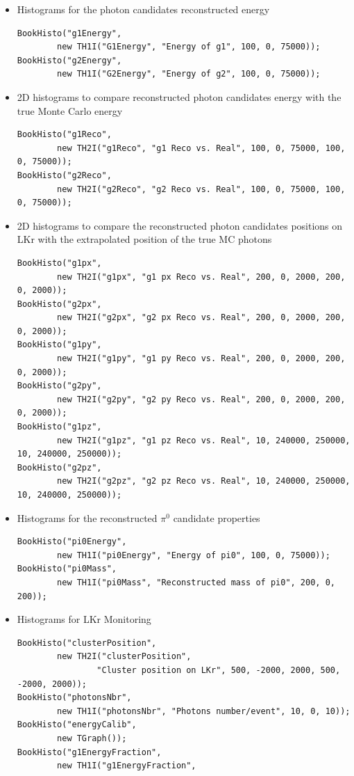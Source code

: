 \begin{itemize}
  \item Histograms for the photon candidates reconstructed energy 
\begin{lstlisting}
BookHisto("g1Energy", 
		new TH1I("G1Energy", "Energy of g1", 100, 0, 75000));
BookHisto("g2Energy", 
		new TH1I("G2Energy", "Energy of g2", 100, 0, 75000));
\end{lstlisting}
	\item 2D histograms to compare reconstructed photon candidates energy with the true Monte Carlo
	energy
\begin{lstlisting}
BookHisto("g1Reco", 
		new TH2I("g1Reco", "g1 Reco vs. Real", 100, 0, 75000, 100, 0, 75000));
BookHisto("g2Reco", 
		new TH2I("g2Reco", "g2 Reco vs. Real", 100, 0, 75000, 100, 0, 75000));
\end{lstlisting}
	\item 2D histograms to compare the reconstructed photon candidates positions on LKr with the
	extrapolated position of the true MC photons
\begin{lstlisting}
BookHisto("g1px", 
		new TH2I("g1px", "g1 px Reco vs. Real", 200, 0, 2000, 200, 0, 2000));
BookHisto("g2px", 
		new TH2I("g2px", "g2 px Reco vs. Real", 200, 0, 2000, 200, 0, 2000));
BookHisto("g1py", 
		new TH2I("g1py", "g1 py Reco vs. Real", 200, 0, 2000, 200, 0, 2000));
BookHisto("g2py", 
		new TH2I("g2py", "g2 py Reco vs. Real", 200, 0, 2000, 200, 0, 2000));
BookHisto("g1pz", 
		new TH2I("g1pz", "g1 pz Reco vs. Real", 10, 240000, 250000, 10, 240000, 250000));
BookHisto("g2pz", 
		new TH2I("g2pz", "g2 pz Reco vs. Real", 10, 240000, 250000, 10, 240000, 250000));
\end{lstlisting}
	\item Histograms for the reconstructed $\pi^0$ candidate properties
\begin{lstlisting}
BookHisto("pi0Energy", 
		new TH1I("pi0Energy", "Energy of pi0", 100, 0, 75000));
BookHisto("pi0Mass", 
		new TH1I("pi0Mass", "Reconstructed mass of pi0", 200, 0, 200));
\end{lstlisting}
	\item Histograms for LKr Monitoring
\begin{lstlisting}
BookHisto("clusterPosition", 
		new TH2I("clusterPosition", 
				"Cluster position on LKr", 500, -2000, 2000, 500, -2000, 2000));
BookHisto("photonsNbr", 
		new TH1I("photonsNbr", "Photons number/event", 10, 0, 10));
BookHisto("energyCalib", 
		new TGraph());
BookHisto("g1EnergyFraction", 
		new TH1I("g1EnergyFraction", 

\end{lstlisting}
\end{itemize}
